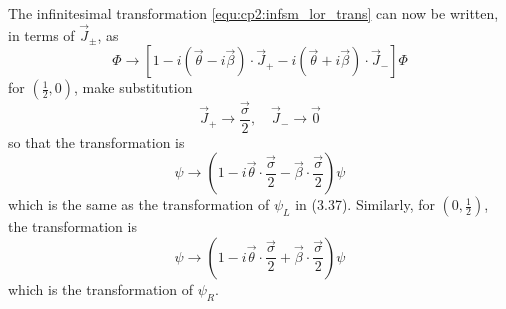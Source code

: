 \begin{problembody}
    \item The infinitesimal transformation \eqref{equ:cp2:infsm_lor_trans} can now be written, in terms of $\vec{J}_\pm$, as
    \begin{equation}\label{equ:cp3:lor_uni_trans}
        \Phi \to \left[1 - i\left(\vec{\theta} - i\vec{\beta}\right)\cdot\vec{J}_+ - i\left(\vec{\theta} + i\vec{\beta}\right)\cdot\vec{J}_-\right] \Phi
    \end{equation}
    for $(\frac{1}{2}, 0)$, make substitution
    \begin{equation*}
        \vec{J}_+ \to \frac{\vec{\sigma}}{2}, \quad \vec{J}_- \to \vec{0}
    \end{equation*}
    so that the transformation is
    \begin{equation}\label{equ:cp3:spinor_trans_L}
        \psi \to \left(1 - i\vec{\theta}\cdot\frac{\vec{\sigma}}{2} - \vec{\beta}\cdot\frac{\vec{\sigma}}{2}\right)\psi
    \end{equation}
    which is the same as the transformation of $\psi_L$ in (3.37). Similarly, for $(0, \frac{1}{2})$, the transformation is
    \begin{equation*}
        \psi \to \left(1 - i\vec{\theta}\cdot\frac{\vec{\sigma}}{2} + \vec{\beta}\cdot\frac{\vec{\sigma}}{2}\right) \psi
    \end{equation*}
    which is the transformation of $\psi_R$.


\end{problembody}
